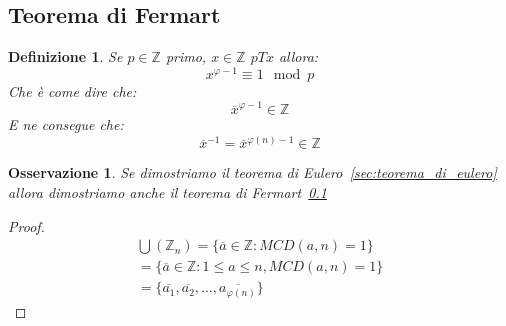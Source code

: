 \documentclass{article}
\newtheorem{definition}{Definizione}[section]
\newtheorem{oss}{Osservazione}[section]
\begin{document}
\subsection{Teorema di Fermart}\label{sec:teorema_di_fermart}
\begin{definition}
        Se $p \in \mathbb{Z}$ primo, $ x \in \mathbb{Z} $ $ p T x  $ allora:
        \begin{equation*}
                x^{\varphi-1} \equiv 1 \mod p
        \end{equation*}
        Che è come dire che:
        \begin{equation*}
                \overline{x}^{\varphi - 1} \in \mathbb{Z}
        \end{equation*}
        E ne consegue che:
        \begin{equation*}
                \overline{x}^{-1} = \overline{x}^{\varphi(n) - 1} \in \mathbb{Z}
        \end{equation*}
\end{definition}

\begin{oss}
        Se dimostriamo il teorema di Eulero~\ref{sec:teorema_di_eulero} allora dimostriamo anche il teorema di Fermart~\ref{sec:teorema_di_fermart}
\end{oss}

\begin{proof}
        \begin{align*}
                \bigcup(\mathbb{Z}_n) = \{\overline{a} \in \mathbb{Z} : MCD(a,n) = 1\} \\
                = \{\overline{a} \in \mathbb{Z} : 1 \le a \le n, MCD(a,n) = 1\} \\
                = \{\overline{a_1}, \overline{a_2},\ldots,\overline{a_{\varphi(n)}}\}
        \end{align*} 
\end{proof}
\end{document}
